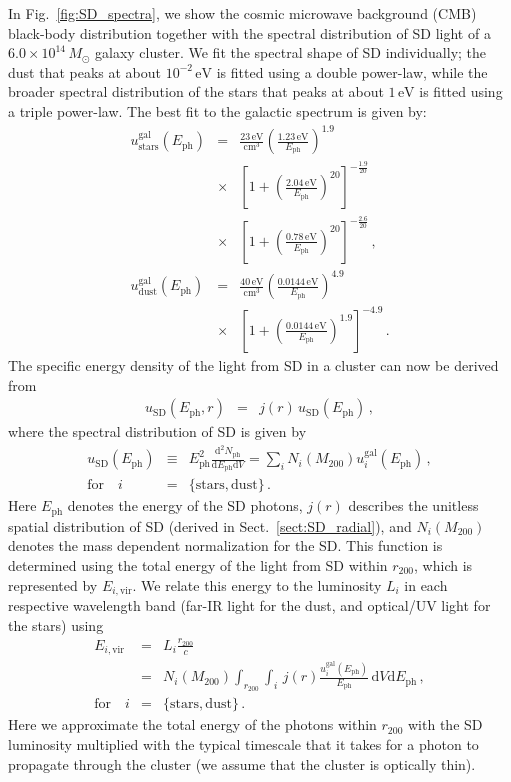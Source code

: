 \documentclass[10pt,aps,pra,reprint,amsmath,amsfonts,amssymb,showpacs,nofootinbib,floatfix]{revtex4-1}
\newcommand{\rmn}{\mathrm}
\newcommand{\ph}{\rmn{ph}}
\newcommand{\eph}{E_\ph}
\newcommand{\vir}{\rmn{vir}}
\newcommand{\gal}{\rmn{gal}}
\newcommand{\sd}{\rmn{SD}}
\newcommand{\msun}{M_\odot}
\newcommand{\stars}{\rmn{stars}}
\newcommand{\dust}{\rmn{dust}}
\newcommand{\ev}{\rmn{eV}}
\newcommand{\dd}{\rmn{d}}
\newcommand{\rvir}{r_{200}}
\newcommand{\mvir}{M_{200}}
\begin{document}
In Fig.~\ref{fig:SD_spectra}, we show the cosmic microwave background
(CMB) black-body distribution together with the spectral distribution
of SD light of a $6.0\times10^{14}\,\msun$ galaxy cluster. We fit the
spectral shape of SD individually; the dust that peaks at about
$10^{-2}\,\ev$ is fitted using a double power-law, while the broader
spectral distribution of the stars that peaks at about $1\,\ev$ is
fitted using a triple power-law. The best fit to the galactic spectrum
is given by:
\begin{eqnarray}
  u_\stars^\gal(\eph) &=& \frac{23\,\rmn{eV}}{\rmn{cm}^3}
  \left(\frac{1.23\,\rmn{eV}}{\eph}\right)^{1.9} \nonumber \\
  &\times&\left[1+\left(\frac{2.04\,\rmn{eV}}{\eph}\right)^{20}\right]
  ^{-\frac{1.9}{20}}\nonumber \\
  &\times& \left[1+\left(\frac{0.78\,\rmn{eV}}{\eph}\right)^{20}\right]^{-\frac{2.6}{20}}\,, \\
  u_\dust^\gal(\eph) &=&
  \frac{40\,\rmn{eV}}{\rmn{cm}^3}
  \left(\frac{0.0144\,\rmn{eV}}{\eph}\right)^{4.9}\nonumber \\
  &\times& \left[1+\left(\frac{0.0144\,\rmn{eV}}{\eph}\right)^{1.9}\right]^{-4.9}\,.
\end{eqnarray}
The specific energy density of the light from SD in a cluster can now
be derived from
\begin{eqnarray}
u_\sd(\eph, r) &=& j(r)\,u_\sd(\eph)\,,
\label{eq:u_SD_er}
\end{eqnarray}
where the spectral distribution of SD is given by
\begin{eqnarray}
  u_\sd(\eph) &\equiv& \eph^2\frac{\dd^2 N_\ph}{\dd \eph \dd V}
  = \sum_i N_i(\mvir) u_i^\gal(\eph)\,,\nonumber \\
\rmn{for}\quad i&=&\{\rmn{stars,dust}\}\,.
\end{eqnarray}
Here $\eph$ denotes the energy of the SD photons, $j(r)$ describes the
unitless spatial distribution of SD (derived in
Sect.~\ref{sect:SD_radial}), and $N_i(\mvir)$ denotes the mass
dependent normalization for the SD. This function is determined using
the total energy of the light from SD within $\rvir$, which is
represented by $E_{i,\vir}$. We relate this energy to the luminosity
$L_i$ in each respective wavelength band (far-IR light for the
dust, and optical/UV light for the stars) using
\begin{eqnarray}
  E_{i,\vir} &=& L_i \frac{\rvir}{c} \nonumber \\
  &=&N_i(\mvir)\int_{\rvir} \int_i \,j(r)
  \frac{u_i^\gal(\eph)}{\eph}\,\dd V\dd \eph\,,\nonumber \\
 \rmn{for}\quad i&=&\{\rmn{stars,dust}\}\,.
\label{eq:E_SD}
\end{eqnarray}
Here we approximate the total energy of the photons within $\rvir$
with the SD luminosity multiplied with the typical timescale that it
takes for a photon to propagate through the cluster (we assume that
the cluster is optically thin).
\end{document}
